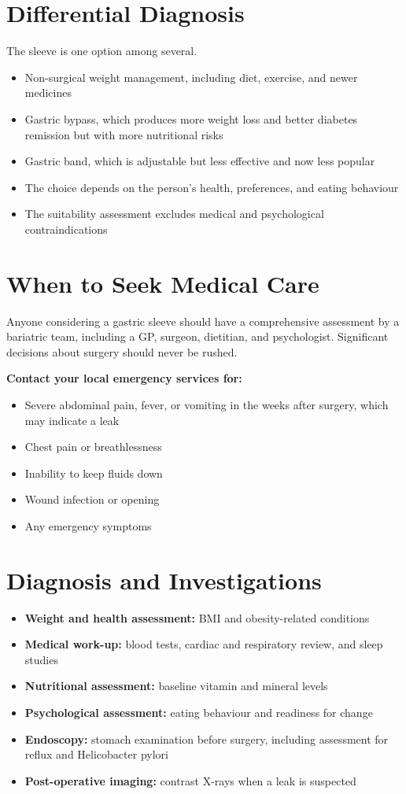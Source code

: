 \section*{Differential Diagnosis}
The sleeve is one option among several.
\begin{itemize}
    \item Non-surgical weight management, including diet, exercise, and newer medicines
    \item Gastric bypass, which produces more weight loss and better diabetes remission but with more nutritional risks
    \item Gastric band, which is adjustable but less effective and now less popular
    \item The choice depends on the person's health, preferences, and eating behaviour
    \item The suitability assessment excludes medical and psychological contraindications
\end{itemize}

\section*{When to Seek Medical Care}
Anyone considering a gastric sleeve should have a comprehensive assessment by a bariatric team, including a GP, surgeon, dietitian, and psychologist. Significant decisions about surgery should never be rushed.

\textbf{Contact your local emergency services for:}
\begin{itemize}
    \item Severe abdominal pain, fever, or vomiting in the weeks after surgery, which may indicate a leak
    \item Chest pain or breathlessness
    \item Inability to keep fluids down
    \item Wound infection or opening
    \item Any emergency symptoms
\end{itemize}

\section*{Diagnosis and Investigations}
\begin{itemize}
    \item \textbf{Weight and health assessment:} BMI and obesity-related conditions
    \item \textbf{Medical work-up:} blood tests, cardiac and respiratory review, and sleep studies
    \item \textbf{Nutritional assessment:} baseline vitamin and mineral levels
    \item \textbf{Psychological assessment:} eating behaviour and readiness for change
    \item \textbf{Endoscopy:} stomach examination before surgery, including assessment for reflux and Helicobacter pylori
    \item \textbf{Post-operative imaging:} contrast X-rays when a leak is suspected
\end{itemize}

